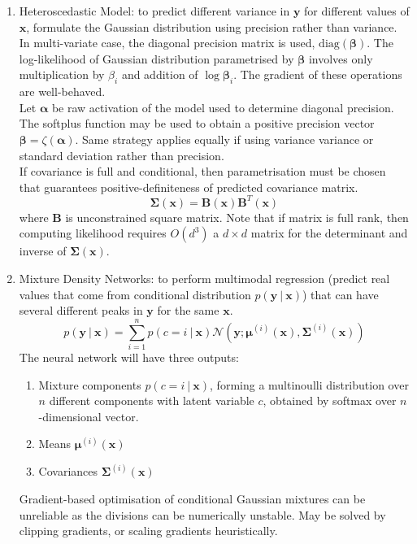 \begin{remark} 
\begin{enumerate}[label=\roman*.]
\setlength{\itemsep}{0pt}
\item Heteroscedastic Model: to predict different variance in $\bm{y}$ for different values of $\bm{x}$, formulate the Gaussian distribution using precision rather than variance. In multi-variate case, the diagonal precision matrix is used, $\text{diag}(\bm{\beta})$. The log-likelihood of Gaussian distribution parametrised by $\bm{\beta}$ involves only multiplication by $\beta_i$ and addition of $\log \bm{\beta}_i$. The gradient of these operations are well-behaved.\\
Let $\bm{\alpha}$ be raw activation of the model used to determine diagonal precision. The softplus function may be used to obtain a positive precision vector $\bm{\beta} = \zeta(\bm{\alpha})$. Same strategy applies equally if using variance variance or standard deviation rather than precision.\\
If covariance is full and conditional, then parametrisation must be chosen that guarantees positive-definiteness of predicted covariance matrix.
\begin{equation*}
\bm{\Sigma}(\bm{x}) = \bm{B}(\bm{x}) \bm{B}^T(\bm{x}) \nonumber
\end{equation*}
where $\bm{B}$ is unconstrained square matrix. Note that if matrix is full rank, then computing likelihood requires $O(d^3)$ a $d \times d$ matrix for the determinant and inverse of $\bm{\Sigma}(\bm{x})$.
\item Mixture Density Networks: to perform multimodal regression (predict real values that come from conditional distribution $p(\bm{y} \ \vert \ \bm{x})$) that can have several different peaks in $\bm{y}$ for the same $\bm{x}$.
\begin{equation*}
p(\bm{y} \ \vert \ \bm{x}) = \sum\limits_{i=1}^n p(c=i \ \vert \ \bm{x}) \mathcal{N}(\bm{y}; \bm{\mu}^{(i)} (\bm{x}), \bm{\Sigma}^{(i)} (\bm{x})) \nonumber
\end{equation*}
The neural network will have three outputs:
\begin{enumerate}[label=\arabic*.]
\setlength{\itemsep}{0pt}
\item Mixture components $p(c = i \ \vert \ \bm{x})$, forming a multinoulli distribution over $n$ different components with latent variable $c$, obtained by softmax over $n$-dimensional vector.
\item Means $\bm{\mu}^{(i)}(\bm{x})$
\item Covariances $\bm{\Sigma}^{(i)}(\bm{x})$
\end{enumerate}
Gradient-based optimisation of conditional Gaussian mixtures can be unreliable as the divisions can be numerically unstable. May be solved by clipping gradients, or scaling gradients heuristically.
\end{enumerate}
\end{remark}

